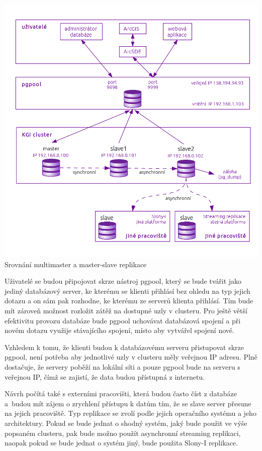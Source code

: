   \begin{center}
    \includegraphics[width=\textwidth]{obr/schema_navrhKatedra.png}
       Srovnání multimaster a master-slave replikace
  \end{center}

Uživatelé se budou připojovat skrze nástroj pgpool, který se bude tvářit jako jediný databázový server, ke kterému se klienti přihlásí bez ohledu na typ jejich dotazu a on sám pak rozhodne, ke kterému ze serverů klienta přihlásí. Tím bude mít zároveň možnost rozložit zátěž na dostupné uzly v clusteru. Pro ještě větší efektivitu provozu databáze bude pgpool uchovávat databázová spojení a při novém dotazu využije stávajícího spojení, místo aby vytvářel spojení nové. 

Vzhledem k tomu, že klienti budou k databázovému serveru přistupovat skrze pgpool, není potřeba aby jednotlivé uzly v clusteru měly veřejnou IP adresu. Plně dostačuje, že servery poběží na lokální síti a pouze pgpool bude na serveru s veřejnou IP, čímž se zajistí, že data budou přístupná z internetu. 

Návrh počítá také s externími pracovišti, která budou často číst z databáze a~budou mít zájem o zrychlení přístupu k datům tím, že se slave server přesune na jejich pracoviště. Typ replikace se zvolí podle jejich operačního systému a jeho architektury. Pokud se bude jednat o shodný systém, jaký bude použit ve výše popsaném clusteru, pak bude možno použít asynchronní streaming replikaci, naopak pokud se bude jednat o systém jiný, bude použita Slony-I replikace. 

